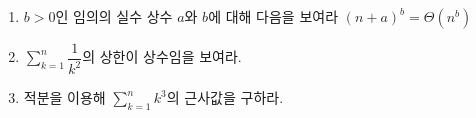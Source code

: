 \usepackage{oblivior}



    \begin{enumerate}
        \item $b>0$인 임의의 실수 상수 $a$와 $b$에 대해 다음을 보여라
        $(n+a)^b = \Theta(n^b)$

        \item $\sum_{k=1}^n \dfrac{1}{k^2}$의 상한이 상수임을 보여라.
        
        \item 적분을 이용해 $\sum_{k=1}^n k^3$의 근사값을 구하라.
    \end{enumerate}
